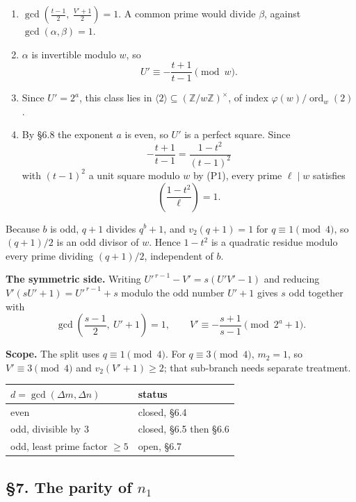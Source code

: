 \documentclass[11pt]{article}
\begin{document}
\begin{enumerate}
\item[(P1)] $\gcd\!\left(\frac{t-1}{2},\ \frac{V'+1}{2}\right) = 1$. A common prime would divide $\beta$, against $\gcd(\alpha,\beta) = 1$.
\item[(P2)] $\alpha$ is invertible modulo $w$, so
\[
U' \equiv -\frac{t+1}{t-1} \pmod{w} .
\]
\item[(P3)] Since $U' = 2^{a}$, this class lies in $\langle 2 \rangle \subseteq \left(\mathbb{Z}/w\mathbb{Z}\right)^\times$, of index $\varphi(w)/\operatorname{ord}_w(2)$.
\item[(P4)] By \S6.8 the exponent $a$ is even, so $U'$ is a perfect square. Since
\[
-\frac{t+1}{t-1} = \frac{1-t^2}{(t-1)^2}
\]
with $(t-1)^2$ a unit square modulo $w$ by (P1), every prime $\ell \mid w$ satisfies
\[
\left(\frac{1-t^{2}}{\ell}\right) = 1 .
\]
\end{enumerate}

Because $b$ is odd, $q+1$ divides $q^{b}+1$, and $v_2(q+1) = 1$ for $q \equiv 1 \pmod 4$, so $(q+1)/2$ is an odd divisor of $w$. Hence $1-t^{2}$ is a quadratic residue modulo every prime dividing $(q+1)/2$, independent of $b$.

\medskip
\noindent\textbf{The symmetric side.} Writing $U'^{\,r-1} - V' = s\left(U'V'-1\right)$ and reducing $V'\left(sU'+1\right) = U'^{\,r-1}+s$ modulo the odd number $U'+1$ gives $s$ odd together with
\[
\gcd\!\left(\frac{s-1}{2},\ U'+1\right) = 1, \qquad V' \equiv -\frac{s+1}{s-1} \pmod{2^{a}+1} .
\]

\medskip
\noindent\textbf{Scope.} The split uses $q \equiv 1 \pmod 4$. For $q \equiv 3 \pmod 4$, $m_2 = 1$, so $V' \equiv 3 \pmod 4$ and $v_2(V'+1) \geq 2$; that sub-branch needs separate treatment.

\medskip
\begin{center}
\begin{tabular}{ll}
\hline
$d = \gcd(\Delta m, \Delta n)$ & status \\
\hline
even & closed, \S6.4 \\
odd, divisible by $3$ & closed, \S6.5 then \S6.6 \\
odd, least prime factor $\geq 5$ & open, \S6.7 \\
\hline
\end{tabular}
\end{center}

\subsection*{\S7. The parity of $n_1$}
\end{document}
